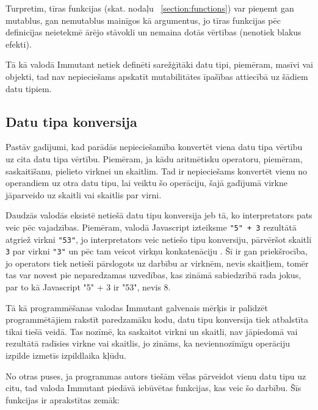 \documentclass[12pt,a4paper]{report}
\begin{document}
Turpretim, tīras funkcijas (skat. nodaļu ~\ref{section:functions}) var pieņemt gan mutablus, gan nemutablus mainīgos kā argumentus, jo tīras funkcijas pēc definicījas neietekmē ārējo stāvokli un nemaina dotās vērtības (nenotiek blakus efekti).

Tā kā valodā Immutant netiek definēti sarežģītāki datu tipi, piemēram, masīvi vai objekti, tad nav nepieciešams apskatīt mutabilitātes īpašības attiecībā uz šādiem datu tipiem. 

\subsection{Datu tipa konversija}

Pastāv gadījumi, kad parādās nepieciešamība konvertēt viena datu tipa vērtību uz cita datu tipa vērtību. Piemēram, ja kādu aritmētisku operatoru, piemēram, saskaitīšanu, pielieto virknei un skaitlim. Tad ir nepieciešams konvertēt vienu no operandiem uz otra datu tipu, lai veiktu šo operāciju, šajā gadījumā virkne jāparveido uz skaitli vai skaitlis par virni. 

Daudzās valodās eksistē netiešā datu tipu konversija jeb tā, ko interpretators pats veic pēc vajadzības. Piemēram, valodā Javascript izteiksme \texttt{"5" + 3} rezultātā atgriež virkni \texttt{"53"}, jo interpretators veic netiešo tipu konversiju, pārvēršot skaitli \texttt{3} par virkni \texttt{"3"} un pēc tam veicot virkņu konkatenāciju \cite{ecma-262}. Šī ir gan priekšrocība, jo operators tiek netieši pārslogots uz darbību ar virknēm, nevis skaitļiem, tomēr tas var novest pie neparedzamas uzvedības, kas zināmā sabiedzrībā rada jokus, par to kā Javascript "5" + 3 ir "53", nevis 8.

Tā kā programmēšanas valodas Immutant galvenais mērķis ir palīdzēt programmētājiem rakstīt paredzamāku kodu, datu tipu konversija tiek atbalstīta tikai tiešā veidā. Tas nozīmē, ka saskaitot virkni un skaitli, nav jāpiedomā vai rezultātā radīsies virkne vai skaitlis, jo zināms, ka neviennozīmīgu operāciju izpilde izmetīs izpildlaika kļūdu.

No otras puses, ja programmas autors tiešām vēlas pārveidot vienu datu tipu uz citu, tad valoda Immutant piedāvā iebūvētas funkcijas, kas veic šo darbību. Šīs funkcijas ir aprakstītas zemāk:
\end{document}
